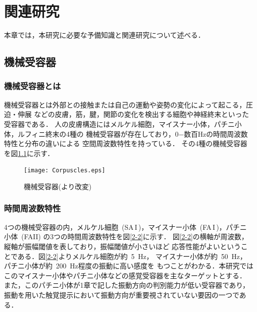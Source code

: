 
\chapter{関連研究}

本章では，本研究に必要な予備知識と関連研究について述べる．

\section{機械受容器}

\subsection{機械受容器とは}
機械受容器とは外部との接触または自己の運動や姿勢の変化によって起こる，圧迫・伸展
などの皮膚，筋，腱，関節の変化を検出する細胞や神経終末といった受容器である．
人の皮膚構造にはメルケル細胞，マイスナー小体，パチニ小体，ルフィニ終末の4種の
機械受容器が存在しており，0$-$数百Hzの時間周波数特性と分布の違いによる
空間周波数特性を持っている\cite{岩村吉晃1984ヒト触覚受容器の構造と特性}．
その4種の機械受容器を図\ref{2-1}に示す．
\begin{figure}[h]
    \begin{center}
    \texttt{[image: Corpuscles.eps]}
    \caption{機械受容器(\cite{Touch:Iwamura}より改変)}
    \label{2-1}
   \end{center}
   \end{figure}

\subsection{時間周波数特性}
4つの機械受容器の内，メルケル細胞\ (SA\rm\,I\,)，マイスナー小体\
(FA\rm\,I\,)，パチニ小体\ (FAI\hspace{-.01em}I)
の3つの時間周波数特性を図\ref{2-2}に示す．
図\ref{2-2}の横軸が周波数，縦軸が振幅閾値を表しており，振幅閾値が小さいほど
応答性能がよいということである．図\ref{2-2}よりメルケル細胞が約\ 5\ Hz，
マイスナー小体が約\ 50\ Hz，パチニ小体が約\ 200\ Hz程度の振動に高い感度を
もつことがわかる．本研究では
このマイスナー小体やパチニ小体などの感覚受容器を主なターゲットとする．
また，このパチニ小体が1章で記した振動方向の判別能力が低い受容器であり，
振動を用いた触覚提示において振動方向が重要視されていない要因の一つである．


